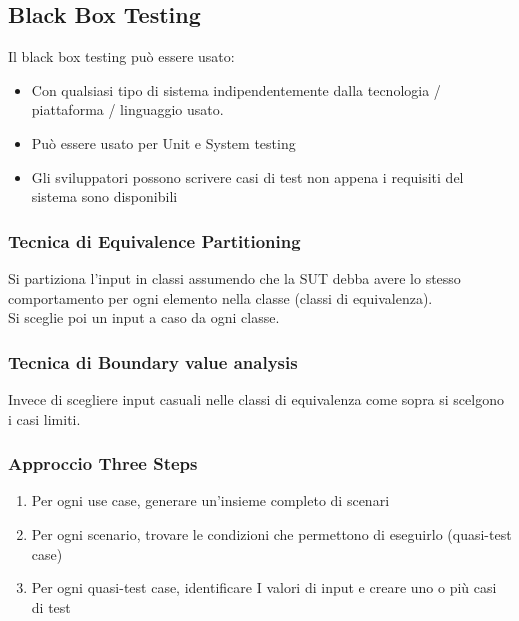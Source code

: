 \subsection{Black Box Testing}
Il black box testing può essere usato:
\begin{itemize}
    \item Con qualsiasi tipo di sistema indipendentemente dalla tecnologia / piattaforma / linguaggio usato.
    \item Può essere usato per Unit e System testing
    \item Gli sviluppatori possono scrivere casi di test non appena i requisiti del sistema sono disponibili
\end{itemize}

\subsubsection{Tecnica di Equivalence Partitioning}
Si partiziona l'input in classi assumendo che la SUT debba avere lo stesso comportamento per ogni elemento nella classe (classi di equivalenza).\\
Si sceglie poi un input a caso da ogni classe.

\subsubsection{Tecnica di Boundary value analysis}
Invece di scegliere input casuali nelle classi di equivalenza come sopra si scelgono i casi limiti.

\subsubsection{Approccio Three Steps}
\begin{enumerate}
    \item Per ogni use case, generare un’insieme completo di scenari
    \item Per ogni scenario, trovare le condizioni che permettono di eseguirlo (quasi-test case)
    \item Per ogni quasi-test case, identificare I valori di input e creare uno o più casi di test
\end{enumerate}